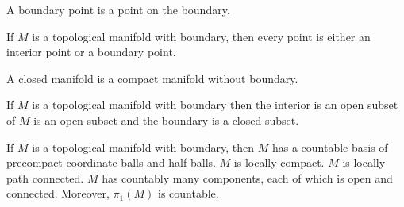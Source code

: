     \begin{definition}
        A boundary point is a point on the boundary.
    \end{definition}
    \begin{theorem}
        If $M$ is a topological manifold with boundary, then every point is
        either an interior point or a boundary point.
    \end{theorem}
    \begin{definition}
        A closed manifold is a compact manifold without boundary.
    \end{definition}
    \begin{theorem}
        If $M$ is a topological manifold with boundary then the interior is
        an open subset of $M$ is an open subset and the boundary is a
        closed subset.
    \end{theorem}
    \begin{theorem}
        If $M$ is a topological manifold with boundary, then $M$ has a
        countable basis of precompact coordinate balls and half balls.
        $M$ is locally compact. $M$ is locally path connected. $M$ has
        countably many components, each of which is open and connected.
        Moreover, $\pi_{1}(M)$ is countable.
    \end{theorem}
